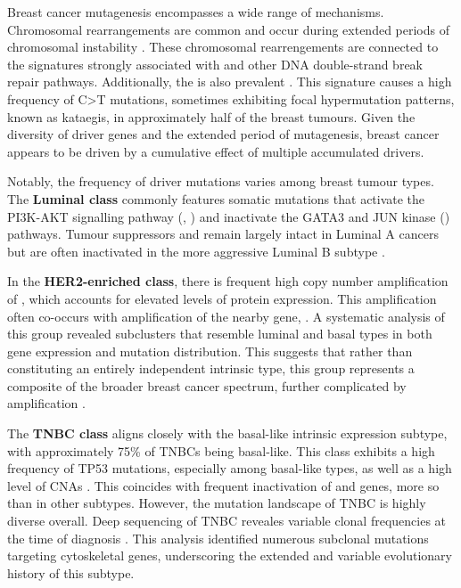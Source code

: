 Breast cancer mutagenesis encompasses a wide range of mechanisms. Chromosomal rearrangements are common and occur during extended periods of chromosomal instability \parencite{Curtis2012-hu, Gerstung2020-sg,Nik-Zainal2012-zz}. These chromosomal rearrengements are connected to the signatures strongly associated with  and other DNA double-strand break repair pathways. Additionally, the  is also prevalent \parencite{Nik-Zainal2016-ek, Banerji2012-as, Nik-Zainal2012-vo}. This signature causes a high frequency of C>T mutations, sometimes exhibiting focal hypermutation patterns, known as kataegis, in approximately half of the breast tumours. Given the diversity of driver genes and the extended period of mutagenesis, breast cancer appears to be driven by a cumulative effect of multiple accumulated drivers.

Notably, the frequency of driver mutations varies among breast tumour types. The \textbf{Luminal class} commonly features somatic mutations that activate the PI3K-AKT signalling pathway (, ) and inactivate the GATA3 and JUN kinase () pathways. Tumour suppressors  and  remain largely intact in Luminal A cancers but are often inactivated in the more aggressive Luminal B subtype \parencite{Cancer_Genome_Atlas_Network2012-gx}.

In the \textbf{HER2-enriched class}, there is frequent high copy number amplification of , which accounts for elevated levels of  protein expression. This amplification often co-occurs with amplification of the nearby gene, . A systematic analysis of this group revealed subclusters that resemble luminal and basal types in both gene expression and mutation distribution. This suggests that rather than constituting an entirely independent intrinsic type, this group represents a composite of the broader breast cancer spectrum, further complicated by  amplification \parencite{Ferrari2016-qj}.

The \textbf{\ac{TNBC} class} aligns closely with the basal-like intrinsic expression subtype, with approximately 75\% of \ac{TNBC}s being basal-like. This class exhibits a high frequency of TP53 mutations, especially among basal-like types, as well as a high level of \ac{CNA}s \parencite{Shah2012-xz, Cancer_Genome_Atlas_Network2012-gx}. This coincides with frequent inactivation of  and  genes, more so than in other subtypes. However, the mutation landscape of \ac{TNBC} is highly diverse overall. Deep sequencing of \ac{TNBC} reveales variable clonal frequencies at the time of diagnosis \parencite{Shah2012-xz}. This analysis identified numerous subclonal mutations targeting cytoskeletal genes, underscoring the extended and variable evolutionary history of this subtype.

